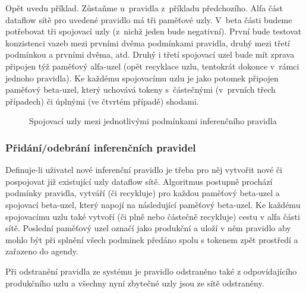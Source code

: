 Opět uvedu příklad. Zůstaňme u~pravidla z~příkladu předchozího. Alfa část
dataflow sítě pro uvedené pravidlo má tři paměťové uzly. V~beta části
budeme potřebovat tři spojovací uzly (z~nichž jeden bude negativní).
První bude testovat konzistenci vazeb mezi prvními dvěma podmínkami
pravidla, druhý mezi třetí podmínkou a prvními dvěma, atd. Druhý i třetí
spojovací uzel bude mít zprava připojen týž paměťový alfa-uzel (opět
recyklace uzlu, tentokrát dokonce v~rámci jednoho pravidla). Ke každému
spojovacímu uzlu je jako potomek připojen paměťový beta-uzel, který
uchovává tokeny s~částečnými (v~prvních třech případech) či úplnými
(ve čtvrtém případě) shodami.

\begin{figure}[h]
\centerline{}
\caption{Spojovací uzly mezi jednotlivými podmínkami inferenčního pravidla\cite{doorenbos}}
\label{condition-joining}
\end{figure}

\subsubsection{Přidání/odebrání inferenčních pravidel}
Definuje-li uživatel nové inferenční pravidlo je třeba pro něj vytvořit
nové či pospojovat již existující uzly dataflow sítě. Algoritmus postupně
prochází podmínky pravidla, vytváří (či recykluje) pro každou paměťový
beta-uzel a spojovací beta-uzel, který napojí na následující paměťový beta-uzel.
Ke každému spojovacímu uzlu také vytvoří (či plně nebo částečně recykluje)
cestu v alfa části sítě. Poslední paměťový uzel označí jako produkční
a uloží v něm pravidlo aby mohlo být při splnění všech podmínek předáno
spolu s tokenem zpět prostředí a zařazeno do agendy.

Při odstranění pravidla ze systému je pravidlo odstraněno také z odpovídajícího
produkčního uzlu a všechny nyní zbytečné uzly jsou ze sítě odstraněny.

